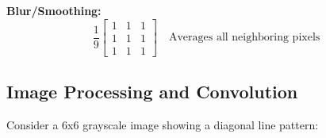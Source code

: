 \documentclass[a4paper, 12pt]{extarticle}
\begin{document}
\textbf{Blur/Smoothing:}
\[
\frac{1}{9}\begin{bmatrix}
1 & 1 & 1 \\
1 & 1 & 1 \\
1 & 1 & 1
\end{bmatrix}
\quad
\text{Averages all neighboring pixels}
\]

\clearpage

\subsection{Image Processing and Convolution}

Consider a 6x6 grayscale image showing a diagonal line pattern:

\begin{center}
\end{center}
\end{document}
